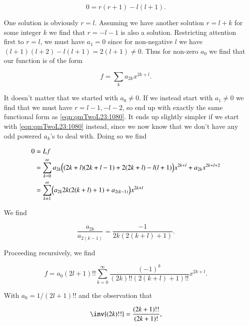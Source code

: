 \begin{equation}\label{eqn:qmTwoL23:1060}
0 = r( r + 1) - l(l + 1).
\end{equation}

One solution is obviously $r = l$.  Assuming we have another solution $r = l + k$ for some integer $k$ we find that $r = -l-1$ is also a solution.  Restricting attention first to $r = l$, we must have $a_1 = 0$ since for non-negative $l$ we have $(l+1)(l+2) - l(l+1) = 2(l+1) \ne 0$.  Thus for non-zero $a_0$ we find that our function is of the form

\begin{equation}\label{eqn:qmTwoL23:1080}
f = \sum_k a_{2k} x^{2k + l}.
\end{equation}

It doesn't matter that we started with $a_0 \ne 0$.  If we instead start with $a_1 \ne 0$ we find that we must have $r = l-1, -l-2$, so end up with exactly the same functional form as \ref{eqn:qmTwoL23:1080}.  It ends up slightly simpler if we start with \ref{eqn:qmTwoL23:1080} instead, since we now know that we don't have any odd powered $a_k$'s to deal with.  Doing so we find

\begin{align*}
0 
&= L f \\
&= 
\sum_{k=0}^\infty a_{2k} \Bigl(
(2k + l)(2k + l - 1) + 2(2k + l) - l (l+1)
\Bigr) x^{2k + l} + a_{2k} x^{2k + l + 2} \\
&=
\sum_{k=1}^\infty \Bigl(
a_{2k} 2k (2 (k+l) + 1) + a_{2(k-1)}
\Bigr) x^{2k + l} 
\end{align*}

We find

\begin{equation}\label{eqn:qmTwoL23:1100}
\frac{
a_{2k} 
}{a_{2(k-1)}}
= 
\frac{-1}{
2k (2 (k+l) + 1) 
}.
\end{equation}

Proceeding recursively, we find

\begin{equation}\label{eqn:qmTwoL23:1120}
f = a_0 (2 l + 1)!! \sum_{k=0}^\infty \frac{(-1)^k}{(2k)!! (2 (k+l) + 1)!!} x^{2k + l}.
\end{equation}

With $a_0 = 1/(2l + 1)!!$ and the observation that

\begin{equation}\label{eqn:qmTwoL23:1140}
\inv{(2k)!!} = \frac{(2k + 1)!!}{(2k+1)!},
\end{equation}

